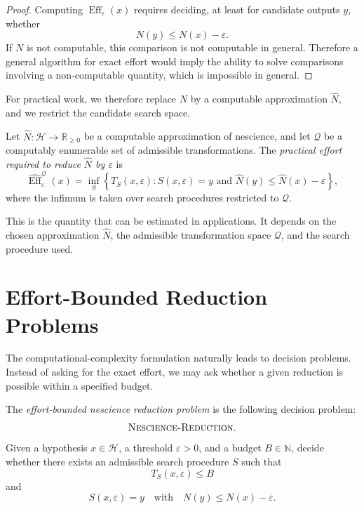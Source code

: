 \begin{proof}
Computing \(\operatorname{Eff}_{\varepsilon}(x)\) requires deciding, at least for candidate outputs \(y\), whether
\[
N(y)\leq N(x)-\varepsilon.
\]
If \(N\) is not computable, this comparison is not computable in general. Therefore a general algorithm for exact effort would imply the ability to solve comparisons involving a non-computable quantity, which is impossible in general.
\end{proof}

For practical work, we therefore replace \(N\) by a computable approximation \(\widehat{N}\), and we restrict the candidate search space.

\begin{definition}
Let \(\widehat{N}:\mathcal{H}\to\mathbb{R}_{\geq 0}\) be a computable approximation of nescience, and let \(\mathcal{Q}\) be a computably enumerable set of admissible transformations. The \emph{practical effort required to reduce \(\widehat{N}\) by \(\varepsilon\)} is
\[
\widehat{\operatorname{Eff}}_{\varepsilon}^{\mathcal{Q}}(x)
=
\inf_{S}
\left\{
T_S(x,\varepsilon):
S(x,\varepsilon)=y
\text{ and }
\widehat{N}(y)\leq \widehat{N}(x)-\varepsilon
\right\},
\]
where the infimum is taken over search procedures restricted to \(\mathcal{Q}\).
\end{definition}

This is the quantity that can be estimated in applications. It depends on the chosen approximation \(\widehat{N}\), the admissible transformation space \(\mathcal{Q}\), and the search procedure used.

\section{Effort-Bounded Reduction Problems}
\label{sec:effort_bounded_reduction}

The computational-complexity formulation naturally leads to decision problems. Instead of asking for the exact effort, we may ask whether a given reduction is possible within a specified budget.

\begin{definition}
The \emph{effort-bounded nescience reduction problem} is the following decision problem:
\[
\textsc{Nescience-Reduction}.
\]
Given a hypothesis \(x\in\mathcal{H}\), a threshold \(\varepsilon>0\), and a budget \(B\in\mathbb{N}\), decide whether there exists an admissible search procedure \(S\) such that
\[
T_S(x,\varepsilon)\leq B
\]
and
\[
S(x,\varepsilon)=y
\quad\text{with}\quad
N(y)\leq N(x)-\varepsilon.
\]
\end{definition}

